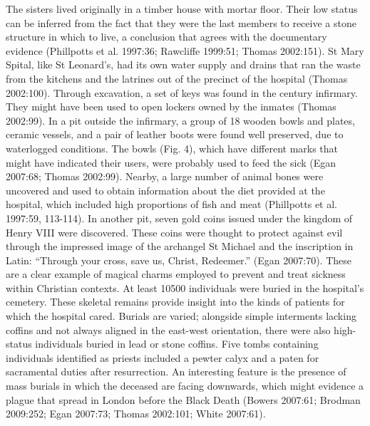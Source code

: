 \documentclass[%
	]{ijsra}
\begin{document}
The sisters lived originally in a timber house with mortar floor. Their low status can be inferred from the fact that they were the last members to receive a stone structure in which to live, a conclusion that agrees with the documentary evidence (Phillpotts et al. 1997:36; Rawcliffe 1999:51; Thomas 2002:151).
St Mary Spital, like St Leonard’s, had its own water supply and drains that ran the waste from the kitchens and the latrines out of the precinct of the hospital (Thomas 2002:100). 
\IJSRAseparator
{}
Through excavation, a set of keys was found in the  century infirmary. They might have been used to open lockers owned by the inmates (Thomas 2002:99). In a pit outside the infirmary, a group of 18 wooden bowls and plates, ceramic vessels, and a pair of leather boots were found well preserved, due to waterlogged conditions. The bowls (Fig. 4), %
which have different marks that might have indicated their users, were probably used to feed the sick (Egan 2007:68; Thomas 2002:99). Nearby, a large number of animal bones were uncovered and used to obtain information about the diet provided at the hospital, which included high proportions of fish and meat (Phillpotts et al. 1997:59, 113-114).
In another pit, seven gold coins issued under the kingdom of Henry VIII were discovered. These coins were thought to protect against evil through the impressed image of the archangel St Michael and the inscription in Latin: \enquote{Through your cross, save us, Christ, Redeemer.}  (Egan 2007:70). 
These are a clear example of magical charms employed to prevent and treat sickness within Christian contexts. 
At least \num{10500} individuals were buried in the hospital’s cemetery. These skeletal remains provide insight into the kinds of patients for which the hospital cared.  Burials are varied; alongside simple interments lacking coffins and not always aligned in the east-west orientation, there were also high-status individuals buried in lead or stone coffins. Five tombs containing individuals identified as priests included a pewter calyx and a paten for sacramental duties after resurrection. An interesting feature is the presence of mass burials in which the deceased are facing downwards, which might evidence a plague that spread in London before the Black Death (Bowers 2007:61; Brodman 2009:252; Egan 2007:73; Thomas 2002:101; White 2007:61).
\end{document}
